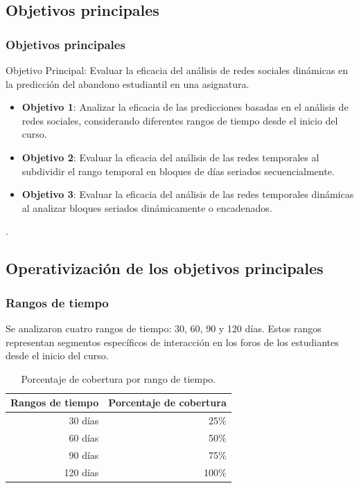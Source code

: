 \documentclass{beamer}
\begin{document}
\subsection{Objetivos principales}
\begin{frame}
	\frametitle{Objetivos principales}
	\begin{block}{Objetivo Principal: Evaluar la eficacia del análisis de redes sociales dinámicas en la predicción del abandono estudiantil en una asignatura.}
		\begin{itemize}

			\item  \textbf{Objetivo 1}: Analizar la eficacia de las predicciones basadas en el análisis de redes sociales, considerando diferentes rangos de tiempo desde el inicio del curso.
					
			\item  \textbf{Objetivo 2}: Evaluar la eficacia del análisis de las redes temporales al subdividir el rango temporal en bloques de días seriados secuencialmente.
			
			\item  	\textbf{Objetivo 3}: Evaluar la eficacia del análisis de las redes temporales dinámicas al analizar bloques seriados dinámicamente o encadenados.
					
		\end{itemize}. 
	\end{block}
\end{frame}

\subsection{Operativización de los objetivos principales}
\begin{frame}
	\frametitle{Rangos de tiempo}
	Se analizaron cuatro rangos de tiempo: 30, 60, 90 y 120 días. Estos rangos representan segmentos específicos de interacción en los foros de los estudiantes desde el inicio del curso. 
	\begin{table}[H]
		\centering
		\begin{tabular}{rr}
			\toprule
			Rangos de tiempo & Porcentaje de cobertura \\
			\midrule
			30 días & 25\% \\
			60 días & 50\% \\
			90 días & 75\% \\
			120 días & 100\% \\
			\bottomrule
		\end{tabular}
		\caption{Porcentaje de cobertura por rango de tiempo.}
		\label{tab:subdivision-porcentaje1}
	\end{table}
\end{frame}
\end{document}

